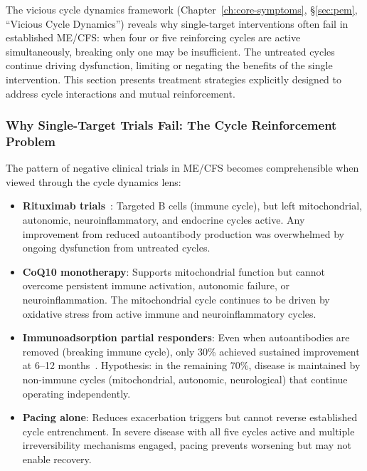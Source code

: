 The vicious cycle dynamics framework (Chapter~\ref{ch:core-symptoms}, \S\ref{sec:pem}, ``Vicious Cycle Dynamics'') reveals why single-target interventions often fail in established ME/CFS: when four or five reinforcing cycles are active simultaneously, breaking only one may be insufficient. The untreated cycles continue driving dysfunction, limiting or negating the benefits of the single intervention. This section presents treatment strategies explicitly designed to address cycle interactions and mutual reinforcement.

\subsubsection{Why Single-Target Trials Fail: The Cycle Reinforcement Problem}

The pattern of negative clinical trials in ME/CFS becomes comprehensible when viewed through the cycle dynamics lens:

\begin{itemize}
    \item \textbf{Rituximab trials}~\cite{Fluge2019}: Targeted B cells (immune cycle), but left mitochondrial, autonomic, neuroinflammatory, and endocrine cycles active. Any improvement from reduced autoantibody production was overwhelmed by ongoing dysfunction from untreated cycles.

    \item \textbf{CoQ10 monotherapy}: Supports mitochondrial function but cannot overcome persistent immune activation, autonomic failure, or neuroinflammation. The mitochondrial cycle continues to be driven by oxidative stress from active immune and neuroinflammatory cycles.

    \item \textbf{Immunoadsorption partial responders}: Even when autoantibodies are removed (breaking immune cycle), only 30\% achieved sustained improvement at 6--12 months~\cite{Scheibenbogen2018immunoadsorption}. Hypothesis: in the remaining 70\%, disease is maintained by non-immune cycles (mitochondrial, autonomic, neurological) that continue operating independently.

    \item \textbf{Pacing alone}: Reduces exacerbation triggers but cannot reverse established cycle entrenchment. In severe disease with all five cycles active and multiple irreversibility mechanisms engaged, pacing prevents worsening but may not enable recovery.
\end{itemize}

